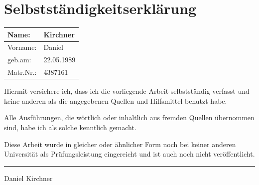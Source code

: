 \documentclass[a4paper,enabledeprecatedfontcommands,abstract=on,twoside=true,bibliography=totoc]{scrreprt}
\numberwithin{TODO}{chapter}
\numberwithin{equation}{section}
\begin{document}

\appendix
{
\setcounter{secnumdepth}{3}

\setcounter{secnumdepth}{3}

\ttfamily
\footnotesize
\parindent0pt


% 
% 
% 
% 
% 
% 
% 
% 
% 
% 
% 
% 
}

\restoregeometry




\cleardoublepage

\chapter*{Selbstst\"andigkeitserkl\"arung}

\begin{center}
\setlength\extrarowheight{4pt}
\begin{tabularx}{\textwidth}{|X|X|}
\hline
Name: & Kirchner \\
\hline
Vorname: & Daniel \\
\hline
geb.am: & 22.05.1989 \\
\hline
Matr.Nr.: & 4387161 \\
\hline
\end{tabularx}
\end{center}

Hiermit versichere ich, dass ich die vorliegende Arbeit selbstst\"andig
verfasst und keine anderen als die angegebenen Quellen und Hilfsmittel
benutzt habe.

Alle Ausf\"uhrungen, die w\"ortlich oder inhaltlich aus fremden Quellen
\"ubernommen sind, habe ich als solche kenntlich gemacht.

Diese Arbeit wurde in gleicher oder \"ahnlicher Form noch bei keiner
anderen Universit\"at als Pr\"ufungsleistung eingereicht und ist auch
noch nicht ver\"offentlicht.

\vspace{50pt}
\noindent\hfill\rule{7cm}{.4pt}\par
   \hfill Daniel Kirchner
\end{document}
